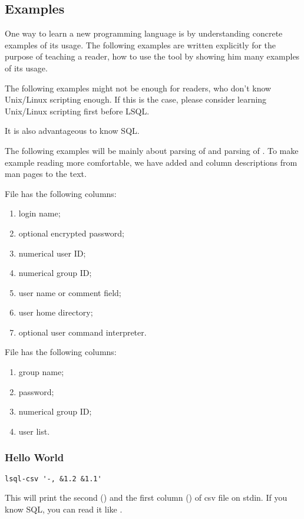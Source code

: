\subsection{Examples}
One way to learn a new programming language is by understanding concrete examples of its usage. The following examples are written explicitly for the purpose of teaching a reader, how to use the tool  by showing him many examples of its usage.

The following examples might not be enough for readers, who don't know Unix/Linux scripting enough. If this is the case, please consider learning Unix/\allowbreak Linux scripting first before LSQL.

It is also advantageous to know SQL.

The following examples will be mainly about parsing of  and parsing of . To make example reading more comfortable, we have added  and  column descriptions from man pages to the text.

File  has the following columns\cite{passwd}:
\begin{enumerate}
    \item login name;
    \item optional encrypted password;
    \item numerical user ID;
    \item numerical group ID;    
    \item user name or comment field;
    \item user home directory;
    \item optional user command interpreter.
\end{enumerate}
File  has the following columns\cite{group}:
\begin{enumerate}
    \item group name;
    \item password;
    \item numerical group ID;
    \item user list.
\end{enumerate}


\subsubsection{Hello World}
\begin{verbatim}
lsql-csv '-, &1.2 &1.1'
\end{verbatim}
This will print the second () and the first column () of csv file on stdin. If you know SQL, you can read it like .

